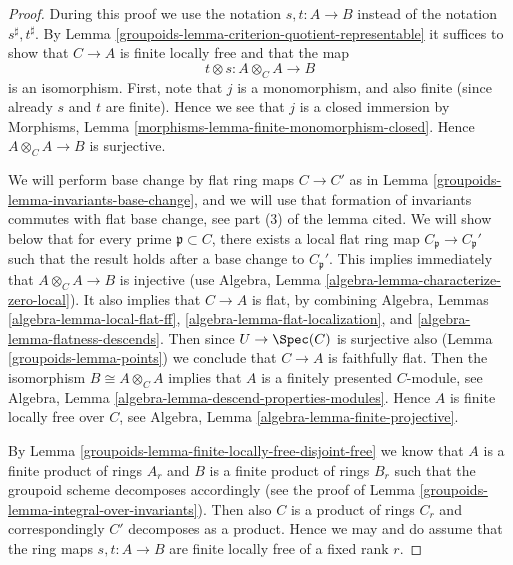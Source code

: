 \begin{proof}

During this proof we use the notation $s, t : A \to B$
instead of the notation $s^\sharp, t^\sharp$.
By Lemma \ref{groupoids-lemma-criterion-quotient-representable}
it suffices to show that $C \to A$ is finite locally free
and that the map
$$
t \otimes s : A \otimes_C A \longrightarrow B
$$
is an isomorphism. First, note that $j$ is a monomorphism, and
also finite (since already $s$ and $t$ are finite). Hence we see
that $j$ is a closed immersion by
Morphisms, Lemma \ref{morphisms-lemma-finite-monomorphism-closed}.
Hence $A \otimes_C A \to B$ is surjective.

\medskip\noindent
We will perform base change by flat ring maps $C \to C'$ as in
Lemma \ref{groupoids-lemma-invariants-base-change}, and we will use that
formation of invariants commutes with flat base change, see
part (3) of the lemma cited.
We will show below that for every prime $\mathfrak p \subset C$, there exists
a local flat ring map $C_{\mathfrak p} \to C_{\mathfrak p}'$
such that the result holds after a base change to $C_{\mathfrak p}'$.
This implies immediately
that $A \otimes_C A \to B$ is injective (use
Algebra, Lemma \ref{algebra-lemma-characterize-zero-local}).
It also implies that $C \to A$ is flat, by combining
Algebra, Lemmas \ref{algebra-lemma-local-flat-ff},
\ref{algebra-lemma-flat-localization}, and
\ref{algebra-lemma-flatness-descends}. Then since $U \to \Spec(C)$
is surjective also (Lemma \ref{groupoids-lemma-points}) we conclude that $C \to A$
is faithfully flat. Then the isomorphism $B \cong A \otimes_C A$
implies that $A$ is a finitely presented $C$-module, see
Algebra, Lemma \ref{algebra-lemma-descend-properties-modules}.
Hence $A$ is finite locally free over $C$, see
Algebra, Lemma \ref{algebra-lemma-finite-projective}.

\medskip\noindent
By Lemma \ref{groupoids-lemma-finite-locally-free-disjoint-free}
we know that $A$ is a finite
product of rings $A_r$ and $B$ is a finite product of rings $B_r$
such that the groupoid scheme decomposes accordingly (see the proof
of Lemma \ref{groupoids-lemma-integral-over-invariants}).
Then also $C$ is a product of rings $C_r$ and
correspondingly $C'$ decomposes as a product. Hence we may and do
assume that the ring maps $s, t : A \to B$ are finite
locally free of a fixed rank $r$.


\end{proof}
